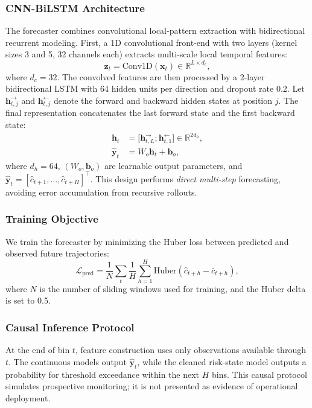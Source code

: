 \documentclass[journal]{IEEEtran}
\begin{document}
\subsubsection{CNN-BiLSTM Architecture}
The forecaster combines convolutional local-pattern extraction with bidirectional recurrent modeling. First, a 1D convolutional front-end with two layers (kernel sizes 3 and 5, 32 channels each) extracts multi-scale local temporal features:
\begin{equation}
\mathbf{z}_t = \mathrm{Conv1D}(\mathbf{x}_t) \in \mathbb{R}^{L \times d_c},
\end{equation}
where $d_c=32$. The convolved features are then processed by a 2-layer bidirectional LSTM with 64 hidden units per direction and dropout rate 0.2. Let $\mathbf{h}_{t,j}^{\rightarrow}$ and $\mathbf{h}_{t,j}^{\leftarrow}$ denote the forward and backward hidden states at position $j$. The final representation concatenates the last forward state and the first backward state:
\begin{align}
\mathbf{h}_t &= \big[\mathbf{h}_{t,L}^{\rightarrow}; \mathbf{h}_{t,1}^{\leftarrow}\big] \in \mathbb{R}^{2d_h}, \\
\hat{\mathbf{y}}_t &= W_o \mathbf{h}_t + \mathbf{b}_o,
\label{eq:cnn_lstm_head}
\end{align}
where $d_h=64$, $(W_o,\mathbf{b}_o)$ are learnable output parameters, and $\hat{\mathbf{y}}_t = [\hat{c}_{t+1},\dots,\hat{c}_{t+H}]^\top$. This design performs \emph{direct multi-step} forecasting, avoiding error accumulation from recursive rollouts.

\subsubsection{Training Objective}
We train the forecaster by minimizing the Huber loss between predicted and observed future trajectories:
\begin{equation}
\mathcal{L}_{\text{pred}} = \frac{1}{N}\sum_{t}\frac{1}{H}\sum_{h=1}^{H}
\mathrm{Huber}\!\left(\hat{c}_{t+h}-\bar{c}_{t+h}\right),
\label{eq:lstm_loss}
\end{equation}
where $N$ is the number of sliding windows used for training, and the Huber delta is set to 0.5.

\subsubsection{Causal Inference Protocol}
At the end of bin $t$, feature construction uses only observations available through $t$. The continuous models output $\hat{\mathbf{y}}_t$, while the cleaned risk-state model outputs a probability for threshold exceedance within the next $H$ bins. This causal protocol simulates prospective monitoring; it is not presented as evidence of operational deployment.
\end{document}
